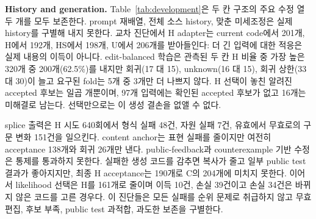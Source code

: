 \documentclass[10pt,conference]{IEEEtran}
\begin{document}
\noindent\textbf{History and generation.} Table~\ref{tab:development}은 두 칸 구조의 주요 수정 열두 개를 모두 보존한다. prompt 재배열, 전체 소스 history, 맞춘 미세조정은 실제 history를 구별해 내지 못한다. 교차 진단에서 H adapter는 current code에서 201개, H에서 192개, HS에서 198개, U에서 206개를 받아들인다: 더 긴 입력에 대한 적응은 실제 내용의 이득이 아니다. edit-balanced 학습은 관측된 두 칸 H 비율 중 가장 높은 320개 중 200개(62.5\%)를 내지만 회귀(17 대 15), unknown(16 대 15), 회귀 상한(33 대 30)이 늘고 요구된 fold는 5개 중 3개만 더 나쁘지 않다. H 선택이 놓친 알려진 accepted 후보는 일곱 개뿐이며, 97개 입력에는 확인된 accepted 후보가 없고 16개는 미해결로 남는다. 선택만으로는 이 생성 결손을 없앨 수 없다.

splice 출력은 H 시도 640회에서 형식 실패 48건, 자원 실패 7건, 유효에서 무효로의 구문 변화 151건을 일으킨다. content anchor는 표현 실패를 줄이지만 여전히 acceptance 138개와 회귀 26개만 낸다. public-feedback과 counterexample 기반 수정은 통제를 통과하지 못한다. 실패한 생성 코드를 감추면 복사가 줄고 일부 public test 결과가 좋아지지만, 최종 H acceptance는 190개로 C의 204개에 미치지 못한다. 이어서 likelihood 선택은 H를 161개로 줄이며 이득 10건, 손실 39건이고 손실 34건은 바뀌지 않은 코드를 고른 경우다. 이 진단들은 모든 실패를 순위 문제로 취급하지 않고 무효 편집, 후보 부족, public test 과적합, 과도한 보존을 구별한다.
\end{document}
